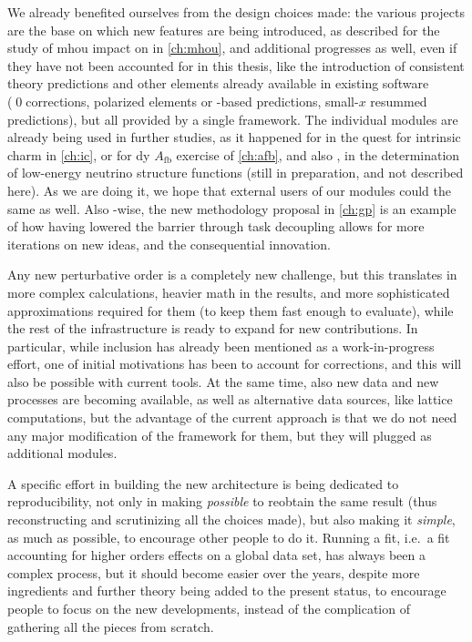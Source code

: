We already benefited ourselves from the design choices made: the various
projects are the base on which new features are being introduced, as described
for the study of \acrlong{mhou} impact on \pdfs in \cref{ch:mhou}, and
additional progresses as well, even if they have not been accounted for in this
thesis, like the introduction of consistent \nnnlo theory predictions and other
elements already available in existing software (\qed corrections, polarized
elements or \ff-based predictions, small-$x$ resummed predictions), but all
provided by a single framework.
%
The individual modules are already being used in further studies, as it
happened for \eko in the quest for intrinsic charm in \cref{ch:ic}, or
\pineappl for \acrlong{dy} $A_{\text{fb}}$ exercise of \cref{ch:afb}, and also
\yadism, in the determination of low-energy neutrino structure functions (still
in preparation, and not described here).
As we are doing it, we hope that external users of our modules could the same
as well.
%
Also \pdf-wise, the new methodology proposal in \cref{ch:gp} is an example of
how having lowered the barrier through task decoupling allows for more
iterations on new ideas, and the consequential innovation.

Any new perturbative order is a completely new challenge, but this translates
in more complex calculations, heavier math in the results, and more
sophisticated approximations required for them (to keep them fast enough to
evaluate), while the rest of the infrastructure is ready to expand for new
contributions.
In particular, while \nnnlo inclusion has already been mentioned as a
work-in-progress effort, one of \pineappl initial motivations has been to
account for \ew corrections, and this will also be possible with current tools.
%
At the same time, also new data and new processes are becoming available, as
well as alternative data sources, like lattice computations, but the advantage
of the current approach is that we do not need any major modification of the
framework for them, but they will plugged as additional modules.

A specific effort in building the new architecture is being dedicated to
reproducibility, not only in making \textit{possible} to reobtain the same
result (thus reconstructing and scrutinizing all the choices made), but also
making it \textit{simple}, as much as possible, to encourage other people to do
it.
%
Running a \pdf fit, i.e.\ a fit accounting for higher orders \qcd effects on a
global data set, has always been a complex process, but it should become easier
over the years, despite more ingredients and further theory being added to the
present status, to encourage people to focus on the new developments, instead
of the complication of gathering all the pieces from scratch.

